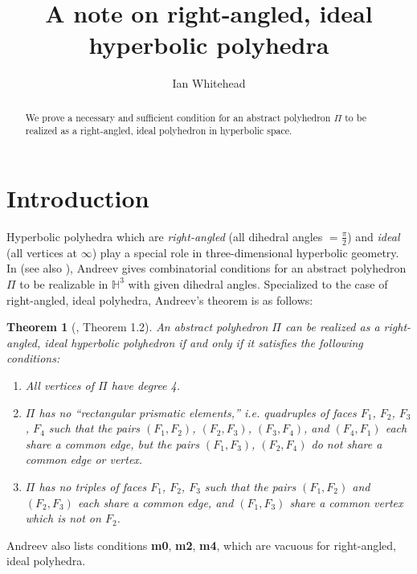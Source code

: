 \documentclass[11pt,letterpaper]{amsart}
\newtheorem{theorem}{Theorem}
\begin{document}
\title{A note on right-angled, ideal hyperbolic polyhedra}

\author{Ian Whitehead}
\address{Department of Mathematics, Statistics, and Computer Science, St. Olaf College, Northfield, MN}

\begin{abstract}
    We prove a necessary and sufficient condition for an abstract polyhedron $\Pi$ to be realized as a right-angled, ideal polyhedron in hyperbolic space.
\end{abstract}
\maketitle
\section{Introduction}

Hyperbolic polyhedra which are \emph{right-angled} (all dihedral angles $=\tfrac{\pi}{2}$) and \emph{ideal} (all vertices at $\infty$) play a special role in three-dimensional hyperbolic geometry. In \cite{Andreev} (see also \cite{RHD}), Andreev gives combinatorial conditions for an abstract polyhedron $\Pi$ to be realizable in $\mathbb{H}^3$ with given dihedral angles. Specialized to the case of right-angled, ideal polyhedra, Andreev's theorem is as follows:
\begin{theorem}[\cite{Andreev}, Theorem 1.2] \label{Theorem1}
An abstract polyhedron $\Pi$ can be realized as a right-angled, ideal hyperbolic polyhedron if and only if it satisfies the following conditions:
\begin{enumerate}
\item[\textbf{m1}] All vertices of $\Pi$ have degree 4. 
\item[\textbf{m3}] $\Pi$ has no ``rectangular prismatic elements,'' i.e. quadruples of faces $F_1$, $F_2$, $F_3$, $F_4$ such that the pairs $(F_1, F_2)$, $(F_2, F_3)$, $(F_3, F_4)$, and $(F_4, F_1)$ each share a common edge, but the pairs $(F_1,F_3)$, $(F_2, F_4)$ do not share a common edge or vertex. 
\item[\textbf{m5}]  $\Pi$ has no triples of faces $F_1$, $F_2$, $F_3$ such that the pairs $(F_1, F_2)$ and $(F_2, F_3)$ each share a common edge, and $(F_1, F_3)$ share a common vertex which is not on $F_2$. 
\end{enumerate}
\end{theorem}
\noindent Andreev also lists conditions \textbf{m0}, \textbf{m2}, \textbf{m4}, which are vacuous for right-angled, ideal polyhedra. 
\end{document}

